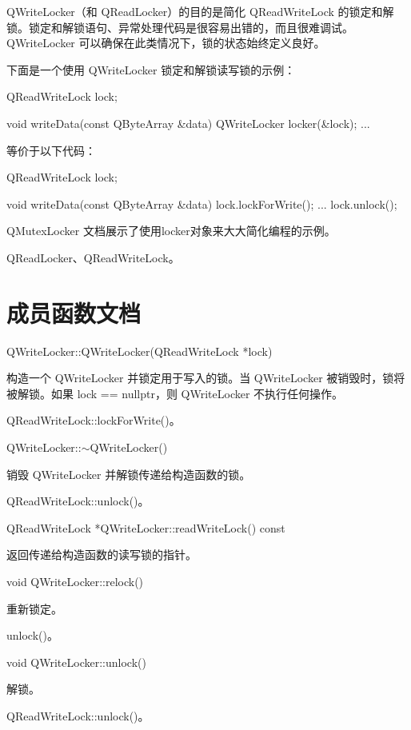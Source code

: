 QWriteLocker（和 QReadLocker）的目的是简化 QReadWriteLock 的锁定和解锁。锁定和解锁语句、异常处理代码是很容易出错的，而且很难调试。QWriteLocker 可以确保在此类情况下，锁的状态始终定义良好。

下面是一个使用 QWriteLocker 锁定和解锁读写锁的示例：


\begin{cppcode}
QReadWriteLock lock;

void writeData(const QByteArray &data)
{
	QWriteLocker locker(&lock);
	...
}
\end{cppcode}

等价于以下代码：

\begin{cppcode}
QReadWriteLock lock;
	
void writeData(const QByteArray &data)
{
	lock.lockForWrite();
	...
	lock.unlock();
}
\end{cppcode}

QMutexLocker 文档展示了使用locker对象来大大简化编程的示例。

\begin{seeAlso}
QReadLocker、QReadWriteLock。
\end{seeAlso}


\section{成员函数文档}

QWriteLocker::QWriteLocker(QReadWriteLock *lock)


构造一个 QWriteLocker 并锁定用于写入的锁。当 QWriteLocker 被销毁时，锁将被解锁。如果 lock == nullptr，则 QWriteLocker 不执行任何操作。


\begin{seeAlso}
QReadWriteLock::lockForWrite()。
\end{seeAlso}



QWriteLocker::$\sim$QWriteLocker()

销毁 QWriteLocker 并解锁传递给构造函数的锁。

\begin{seeAlso}
QReadWriteLock::unlock()。
\end{seeAlso}

QReadWriteLock *QWriteLocker::readWriteLock() const

返回传递给构造函数的读写锁的指针。

void QWriteLocker::relock()

重新锁定。

\begin{seeAlso}
unlock()。
\end{seeAlso}

void QWriteLocker::unlock()

解锁。

\begin{seeAlso}
QReadWriteLock::unlock()。
\end{seeAlso}


